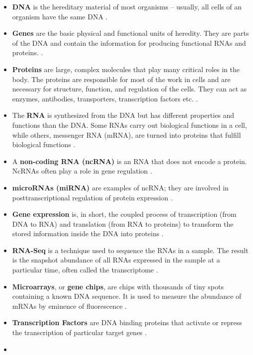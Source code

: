 \documentclass[
]{book}
\begin{document}
\begin{itemize}
\item
  \textbf{DNA} is the hereditary material of most organisms -- usually, all cells of an organism have the same DNA \citep{Slack2013}.
\item
  \textbf{Genes} are the basic physical and functional units of heredity. They are parts of the DNA and contain the information for producing functional RNAs and proteins. \citep{Slack2013}.
\item
  \textbf{Proteins} are large, complex molecules that play many critical roles in the body. The proteins are responsible for most of the work in cells and are necessary for structure, function, and regulation of the cells. They can act as enzymes, antibodies, transporters, transcription factors etc. \citep{Slack2013}.
\item
  The \textbf{RNA} is synthesized from the DNA but has different properties and functions than the DNA. Some RNAs carry out biological functions in a cell, while others, messenger RNA (mRNA), are turned into proteins that fulfill biological functions \citep{Slack2013}.
\item
  A \textbf{non-coding RNA (ncRNA)} is an RNA that does not encode a protein. NcRNAs often play a role in gene regulation \citep{MattickNon-codingRNA}.
\item
  \textbf{microRNAs (miRNA)} are examples of ncRNA; they are involved in posttranscriptional regulation of protein expression \citep{Tanase2012MicroRNAs}.
\item
  \textbf{Gene expression} is, in short, the coupled process of transcription (from DNA to RNA) and translation (from RNA to proteins) to transform the stored information inside the DNA into proteins \citep{Slack2013}.
\item
  \textbf{RNA-Seq} is a technique used to sequence the RNAs in a sample. The result is the snapshot abundance of all RNAs expressed in the sample at a particular time, often called the transcriptome \citep{Metzker2010SequencingGeneration}.
\item
  \textbf{Microarrays}, or \textbf{gene chips}, are chips with thousands of tiny spots containing a known DNA sequence. It is used to measure the abundance of mRNAs by eminence of fluorescence \citep{Slack2013}.
\item
  \textbf{Transcription Factors} are DNA binding proteins that activate or repress the transcription of particular target genes \citep{Latchman1997TranscriptionOverview}.
\item

\end{itemize}
\end{document}
